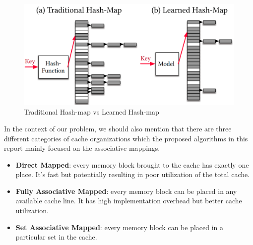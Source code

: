 \begin{figure}[h!]
	\includegraphics[scale=0.2]{figures/learned_index.png}
	\caption{Traditional Hash-map vs Learned Hash-map \cite{learning-index}}
	\label{fig:learned_index}
\end{figure}

In the context of our problem, we should also mention that there are three different categories of cache organizations which the proposed algorithms in this report mainly focused on the associative mappings.
\begin{itemize}
	\item \textbf{Direct Mapped}: every memory block brought to the cache has exactly one place. It's fast but potentially resulting in poor utilization of the total cache.
	
	\item \textbf{Fully Associative Mapped}: every memory block can be placed in any available cache line. It has high implementation overhead but better cache utilization.
	
	\item \textbf{Set Associative Mapped}: every memory block can be placed in a particular set in the cache. 
\end{itemize}
\vspace{1mm}
\noindent

